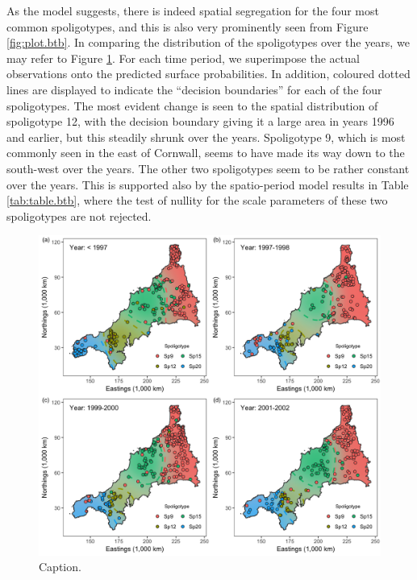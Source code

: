 \documentclass[a4paper,showframe,11pt]{report}\usepackage[]{graphicx}\usepackage[]{color}
\makeatletter
\newenvironment{kframe}{%
 \def\at@end@of@kframe{}%
 \ifinner\ifhmode%
  \def\at@end@of@kframe{\end{minipage}}%
  \begin{minipage}{\columnwidth}%
 \fi\fi%
 \def\FrameCommand##1{\hskip\@totalleftmargin \hskip-\fboxsep
 \colorbox{shadecolor}{##1}\hskip-\fboxsep
     \hskip-\linewidth \hskip-\@totalleftmargin \hskip\columnwidth}%
 \MakeFramed {\advance\hsize-\width
   \@totalleftmargin\z@ \linewidth\hsize
   \@setminipage}}%
 {\par\unskip\endMakeFramed%
 \at@end@of@kframe}
\newenvironment{knitrout}{}{} %
\makeatother
\begin{document}
As the model suggests, there is indeed spatial segregation for the four most common spoligotypes, and this is also very prominently seen from Figure \ref{fig:plot.btb}.
In comparing the distribution of the spoligotypes over the years, we may refer to Figure \ref{fig:plot.temporal.btb}.
For each time period, we superimpose the actual observations onto the predicted surface probabilities.
In addition, coloured dotted lines are displayed to indicate the ``decision boundaries'' for each of the four spoligotypes.
The most evident change is seen to the spatial distribution of spoligotype 12, with the decision boundary giving it a large area in years 1996 and earlier, but this steadily shrunk over the years.
Spoligotype 9, which is most commonly seen in the east of Cornwall, seems to have made its way down to the south-west over the years.
The other two spoligotypes seem to be rather constant over the years.
This is supported also by the spatio-period model results in Table \ref{tab:table.btb}, where the test of nullity for the scale parameters of these two spoligotypes are not rejected.

\begin{knitrout}
\color{fgcolor}\begin{kframe}
\singlespacing\end{kframe}\begin{figure}[p]

{\centering \includegraphics[width=\linewidth]{figure/05-plot_temporal_btb-1} 

}

\caption[Caption]{Caption.}\label{fig:plot.temporal.btb}
\end{figure}


\end{knitrout}
\end{document}
